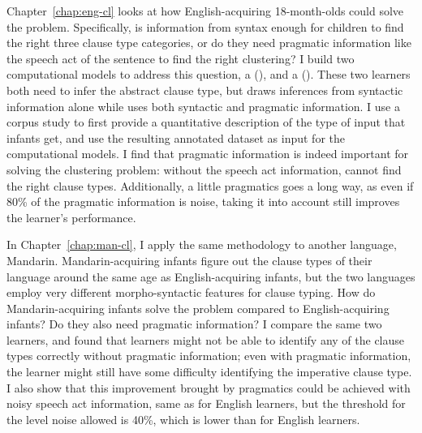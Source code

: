 Chapter~\ref{chap:eng-cl} looks at how English-acquiring 18-month-olds could solve the problem. Specifically, is information from syntax enough for children to find the right three clause type categories, or do they need pragmatic information like the speech act of the sentence to find the right clustering? I build two computational models to address this question, a \distlearner{} (\dlearnerabbr{}), and a \praglearner{} (\plearnerabbr{}). These two learners both need to infer the abstract clause type, but \dlearnerabbr{} draws inferences from syntactic information alone while \plearnerabbr{} uses both syntactic and pragmatic information. I use a corpus study to first provide a quantitative description of the type of input that infants get, and use the resulting annotated dataset as input for the computational models. I find that pragmatic information is indeed important for solving the clustering problem: without the speech act information, \dlearnerabbr{} cannot find the right clause types. Additionally, a little pragmatics goes a long way, as even if 80\% of the pragmatic information is noise, taking it into account still improves the learner's performance. 

In Chapter~\ref{chap:man-cl}, I apply the same methodology to another language, Mandarin. Mandarin-acquiring infants figure out the clause types of their language around the same age as English-acquiring infants, but the two languages employ very different morpho-syntactic features for clause typing. How do Mandarin-acquiring infants solve the problem compared to English-acquiring infants? Do they also need pragmatic information? I compare the same two learners, and found that learners might not be able to identify any of the clause types correctly without pragmatic information; even with pragmatic information, the learner might still have some difficulty identifying the imperative clause type. I also show that this improvement brought by pragmatics could be achieved with noisy speech act information, same as for English learners, but the threshold for the level noise allowed is 40\%, which is lower than for English learners.


